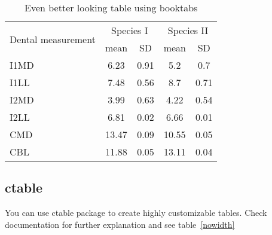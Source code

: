 \begin{table}
\caption{Even better looking table using booktabs}
\centering
\label{table:good_table}
\begin{tabular}{l c c c c}
\toprule
\multirow{2}{*}{Dental measurement} & \multicolumn{2}{c}{Species I} & \multicolumn{2}{c}{Species II} \\ 
\cmidrule{2-5}
  & mean & SD  & mean & SD  \\ 
\midrule
I1MD & 6.23 & 0.91 & 5.2  & 0.7  \\

I1LL & 7.48 & 0.56 & 8.7  & 0.71 \\

I2MD & 3.99 & 0.63 & 4.22 & 0.54 \\

I2LL & 6.81 & 0.02 & 6.66 & 0.01 \\

CMD & 13.47 & 0.09 & 10.55 & 0.05 \\

CBL & 11.88 & 0.05 & 13.11 & 0.04\\ 
\bottomrule
\end{tabular}
\end{table}
\subsection{ctable}
You can use ctable package to create highly customizable tables. Check documentation for further explanation and see table~\ref{nowidth} 




